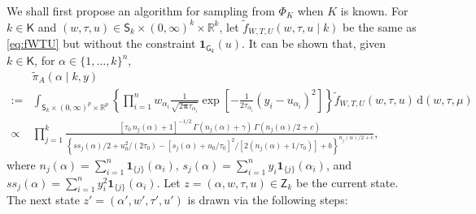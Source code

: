 \documentclass[12pt]{article}
\newcommand{\df}{\mathrm{d}}
\newcommand{\Z}{\mathsf{Z}}
\newcommand{\ind}{\mathbf{1}}
\begin{document}
We shall first propose an algorithm for sampling from $\Phi_K$ when $K$ is known.
For $k \in \mathsf{K}$ and $(w,\tau,u) \in \mathsf{S}_k \times (0,\infty)^k \times \mathbb{R}^k$, let $\tilde{f}_{W,T,U}(w,\tau,u \mid k)$ be the same as \eqref{eq:fWTU} but without the constraint $\ind_{\mathsf{G}_k}(u)$.
It can be shown that, given $k \in \mathsf{K}$, for $\alpha \in \{1,\dots,k\}^n$,
\[
\begin{aligned}
	&\tilde{\pi}_A(\alpha \mid k, y) \\
	:=& \int_{\mathsf{S}_k \times (0,\infty)^p \times \mathbb{R}^p} \left\{ \prod_{i=1}^n w_{\alpha_i} \frac{1}{\sqrt{2\bm{\pi} \tau_{\alpha_i} } } \exp\left[ - \frac{1}{2 \tau_{\alpha_i}} (y_i - u_{\alpha_i})^2 \right] \right\}  \tilde{f}_{W,T,U}(w,\tau,u) \, \df (w, \tau, \mu) \\
	\propto & \prod_{j=1}^k  \frac{ [\tau_0 \, n_j(\alpha) + 1]^{-1/2} \, \Gamma(n_j(\alpha) + \gamma) \, \Gamma(n_j(\alpha)/2 + c) }{ \left\{ \mathit{ss}_j(\alpha)/2 +u_0^2/(2\tau_0) -[ s_j(\alpha) + u_0/\tau_0]^2/[2 (n_j(\alpha) + 1/\tau_0)] + b \right\}^{n_j(\alpha)/2 + c} },
\end{aligned}
\]
where $n_j(\alpha) = \sum_{i=1}^n \ind_{\{j\}}(\alpha_i)$, $s_j(\alpha) = \sum_{i=1}^n  y_i \ind_{\{j\}}(\alpha_i)$, and $\mathit{ss}_j(\alpha) = \sum_{i=1}^n y_i^2 \ind_{\{j\}}(\alpha_i)$.
Let $z = (\alpha,w,\tau,u) \in \Z_k$ be the current state.
The next state $z' = (\alpha',w',\tau',u')$ is drawn via the following steps:
\end{document}
